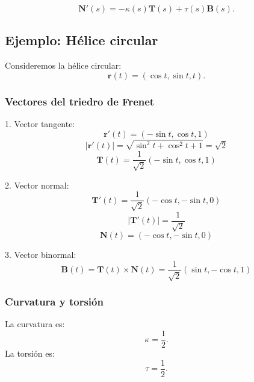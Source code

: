 \documentclass[11pt]{book}
\theoremstyle{definicion}
\theoremstyle{teorema}
\theoremstyle{ejemplo}
\begin{document}
\[
\mathbf{N}'(s) =
-\kappa(s) \mathbf{T}(s) + \tau(s) \mathbf{B}(s).
\]

\subsection{Ejemplo: Hélice circular}

\noindent
Consideremos la hélice circular:
\[ \mathbf{r}(t) = (\cos t, \sin t, t). \]

\subsubsection*{Vectores del triedro de Frenet}
1. Vector tangente:
\[ \mathbf{r}'(t) = (-\sin t, \cos t, 1) \]
\[ |\mathbf{r}'(t)| = \sqrt{\sin^2 t + \cos^2 t + 1} = \sqrt{2} \]
\[ \mathbf{T}(t) = \frac{1}{\sqrt{2}} (-\sin t, \cos t, 1) \]

2. Vector normal:
\[ \mathbf{T}'(t) = \frac{1}{\sqrt{2}} (-\cos t, -\sin t, 0) \]
\[ |\mathbf{T}'(t)| = \frac{1}{\sqrt{2}} \]
\[ \mathbf{N}(t) = (-\cos t, -\sin t, 0) \]

3. Vector binormal:
\[ \mathbf{B}(t) = \mathbf{T}(t) \times \mathbf{N}(t) = \frac{1}{\sqrt{2}} (\sin t, -\cos t, 1) \]

\subsubsection*{Curvatura y torsión}
\noindent La curvatura es:
\[ \kappa = \frac{1}{2}. \]
La torsión es:
\[ \tau = \frac{1}{2}. \]





\end{document}
